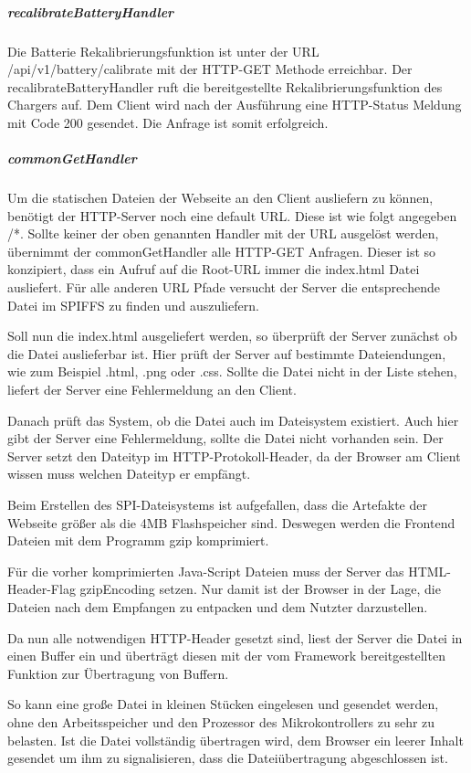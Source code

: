 \subparagraph{recalibrateBatteryHandler} Die Batterie Rekalibrierungsfunktion ist unter der URL \glqq /api/v1/battery/calibrate\grqq{} mit der HTTP-GET Methode erreichbar. Der \glqq recalibrateBatteryHandler\grqq{} ruft die bereitgestellte Rekalibrierungsfunktion des Chargers auf.
Dem Client wird nach der Ausführung eine HTTP-Status Meldung mit Code 200 gesendet. Die Anfrage ist somit erfolgreich.

\subparagraph{commonGetHandler} Um die statischen Dateien der Webseite an den Client ausliefern zu können, benötigt der HTTP-Server noch eine default URL. Diese ist wie folgt angegeben \glqq /*\grqq{}. Sollte keiner der oben genannten Handler mit der URL ausgelöst werden, übernimmt der \glqq commonGetHandler\grqq{} alle HTTP-GET Anfragen.
Dieser ist so konzipiert, dass ein Aufruf auf die Root-URL immer die index.html Datei ausliefert. Für alle anderen URL Pfade versucht der Server die entsprechende Datei im SPIFFS zu finden und auszuliefern.

Soll nun die index.html ausgeliefert werden, so überprüft der Server zunächst ob die Datei auslieferbar ist. Hier prüft der Server auf bestimmte Dateiendungen, wie zum Beispiel .html, .png oder .css. Sollte die Datei nicht in der Liste stehen, liefert der Server eine Fehlermeldung an den Client.

Danach prüft das System, ob die Datei auch im Dateisystem existiert. Auch hier gibt der Server eine Fehlermeldung, sollte die Datei nicht vorhanden sein. Der Server setzt den Dateityp im HTTP-Protokoll-Header, da der Browser am Client wissen muss welchen Dateityp er empfängt.

Beim Erstellen des SPI-Dateisystems ist aufgefallen, dass die Artefakte der Webseite größer als die 4MB Flashspeicher sind. Deswegen werden die Frontend Dateien mit dem Programm \glqq gzip\grqq{} komprimiert.

Für die vorher komprimierten Java-Script Dateien muss der Server das HTML-Header-Flag \glqq gzipEncoding\grqq{} setzen. Nur damit ist der Browser in der Lage, die Dateien nach dem Empfangen zu entpacken und dem Nutzter darzustellen.

Da nun alle notwendigen HTTP-Header gesetzt sind, liest der Server die Datei in einen Buffer ein und überträgt diesen mit der vom Framework bereitgestellten Funktion zur Übertragung von Buffern.

So kann eine große Datei in kleinen Stücken eingelesen und gesendet werden, ohne den Arbeitsspeicher und den Prozessor des Mikrokontrollers zu sehr zu belasten.
Ist die Datei vollständig übertragen wird, dem Browser ein leerer Inhalt gesendet um ihm zu signalisieren, dass die Dateiübertragung abgeschlossen ist.

